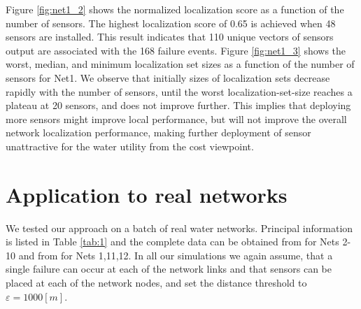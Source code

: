 \documentclass[twocolumn]{autart}
\begin{document}
Figure \ref{fig:net1_2} shows the normalized localization score as a function of the number of sensors. The highest localization score of 0.65 is achieved when 48 sensors are installed. This result indicates that 110 unique vectors of sensors output are associated with the 168 failure events. 
Figure \ref{fig:net1_3} shows the worst, median, and minimum localization set sizes as a function of the number of sensors for Net1. We observe that initially sizes of localization sets decrease rapidly with the number of sensors, until the worst localization-set-size reaches a plateau at 20 sensors, and does not improve further. This implies that deploying more sensors might improve local performance, but will not improve the overall network localization performance, making further deployment of sensor unattractive for the water utility from the cost viewpoint. 


\section{Application to real networks} \label{sec:app2}\vspace{-0.35cm}

We tested our approach on a batch of real water networks. Principal information is listed in Table \ref{tab:1} and the complete data can be obtained from \cite{doi:10.1061/(ASCE)WR.1943-5452.0000352} for Nets 2-10 and from \cite{exeter} for Nets 1,11,12. In all our simulations we again assume, that a single failure can occur at each of the network links and that sensors can be placed at each of the network nodes, and set the distance threshold to $\varepsilon = 1000 [m]$. 
\end{document}
